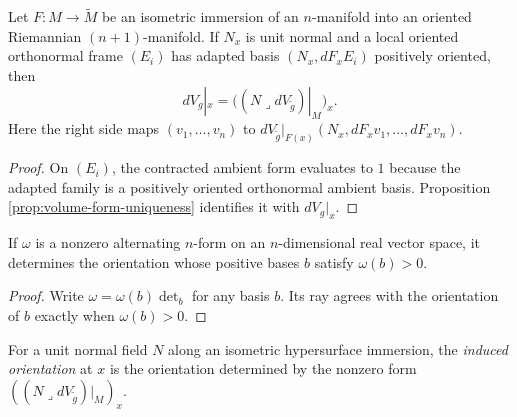 \begin{proposition}[Equation (2.17)]
\label{prop:hypersurface-volume-form-formula}
\leanok
{}
Let $F:M\to\widetilde M$ be an isometric immersion of an $n$-manifold into an oriented Riemannian $(n+1)$-manifold. If $N_x$ is unit normal and a local oriented orthonormal frame $(E_i)$ has adapted basis $(N_x,dF_xE_i)$ positively oriented, then
\begin{equation}
dV_g|_x=\bigl((N\lrcorner dV_{\widetilde g})|_M\bigr)_x. \tag{2.17}
\end{equation}
Here the right side maps $(v_1,\ldots,v_n)$ to $dV_{\widetilde g}|_{F(x)}(N_x,dF_xv_1,\ldots,dF_xv_n)$.
\end{proposition}

\begin{proof}
\leanok
{}
\sketch On $(E_i)$, the contracted ambient form evaluates to $1$ because the adapted family is a positively oriented orthonormal ambient basis. Proposition \ref{prop:volume-form-uniqueness} identifies it with $dV_g|_x$.
\end{proof}

\begin{lemma}
\label{lem:nonvanishing-top-form-orientation}
\leanok
If $\omega$ is a nonzero alternating $n$-form on an $n$-dimensional real vector space, it determines the orientation whose positive bases $b$ satisfy $\omega(b)>0$.
\end{lemma}

\begin{proof}
\leanok
\sketch Write $\omega=\omega(b)\det_b$ for any basis $b$. Its ray agrees with the orientation of $b$ exactly when $\omega(b)>0$.
\end{proof}

\begin{definition}
\label{def:induced-orientation}
\leanok
{}
For a unit normal field $N$ along an isometric hypersurface immersion, the \emph{induced orientation} at $x$ is the orientation determined by the nonzero form $((N\lrcorner dV_{\widetilde g})|_M)_x$.
\end{definition}


